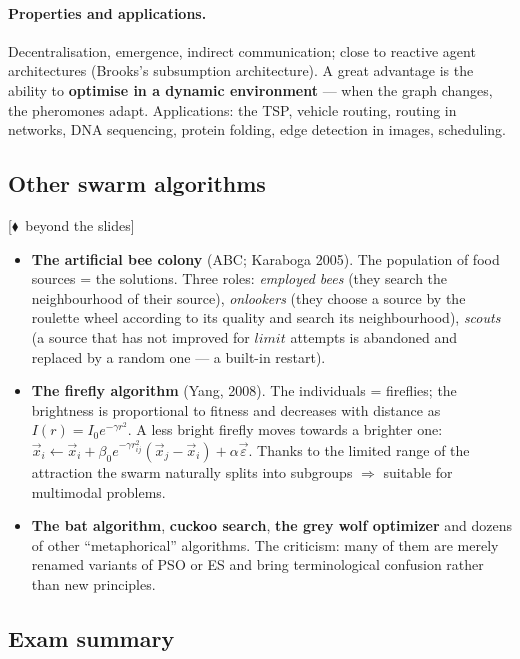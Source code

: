 \documentclass[11pt,a4paper]{article}
\theoremstyle{definition}
\providecommand{\uv}[1]{``#1''}
\newcommand{\mimo}{\textcolor{markcol}{\textsf{\footnotesize[$\blacklozenge$~beyond the slides]}}}
\begin{document}
\paragraph{Properties and applications.} Decentralisation, emergence, indirect
communication; close to reactive agent architectures (Brooks's subsumption
architecture). A great advantage is the ability to \textbf{optimise in a dynamic
environment} --- when the graph changes, the pheromones adapt.
Applications: the TSP, vehicle routing, routing in networks, DNA sequencing,
protein folding, edge detection in images, scheduling.

\subsection{Other swarm algorithms}

\noindent\mimo{}

\begin{itemize}
\item \textbf{The artificial bee colony} (ABC; Karaboga 2005). The population of
  food sources = the solutions. Three roles:
  \emph{employed bees} (they search the neighbourhood of their source),
  \emph{onlookers} (they choose a source by the roulette wheel according to its
  quality and search its neighbourhood),
  \emph{scouts} (a source that has not improved for $limit$ attempts is
  abandoned and replaced by a random one --- a built-in restart).
\item \textbf{The firefly algorithm} (Yang, 2008). The individuals = fireflies;
  the brightness is proportional to fitness and decreases with distance as
  $I(r) = I_0 e^{-\gamma r^2}$. A less bright firefly moves towards a brighter
  one:
  $\vec x_i \gets \vec x_i + \beta_0 e^{-\gamma r_{ij}^2}(\vec x_j - \vec x_i)
  + \alpha \vec\varepsilon$. Thanks to the limited range of the attraction the
  swarm naturally splits into subgroups $\Rightarrow$ suitable for multimodal
  problems.
\item \textbf{The bat algorithm}, \textbf{cuckoo search}, \textbf{the grey wolf
  optimizer} and dozens of other \uv{metaphorical} algorithms. The criticism:
  many of them are merely renamed variants of PSO or ES and bring terminological
  confusion rather than new principles.
\end{itemize}

\subsection{Exam summary}
\end{document}
